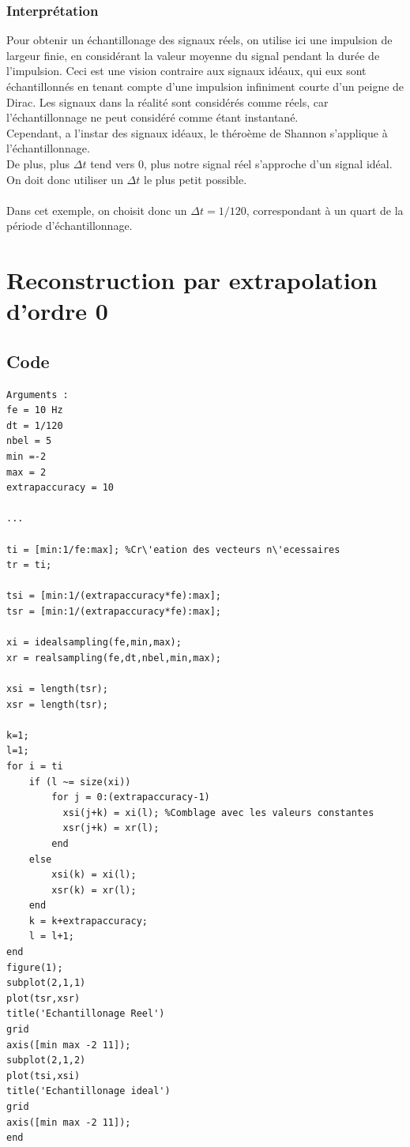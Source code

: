 \documentclass[a4paper, oneside]{report}
\begin{document}
	\subsubsection{Interpr\'etation}
	Pour obtenir un échantillonage des signaux r\'eels, on utilise ici une impulsion de largeur finie, en consid\'erant la valeur moyenne du signal pendant la durée de l'impulsion. Ceci est une vision contraire aux signaux id\'eaux, qui eux sont \'echantillonn\'es en tenant compte d'une impulsion infiniment courte d'un peigne de Dirac. Les signaux dans la r\'ealit\'e sont consid\'er\'es comme r\'eels, car l'\'echantillonnage ne peut  consid\'er\'e comme \'etant instantan\'e.
	\\
	Cependant, a l'instar des signaux id\'eaux, le th\'ero\`eme de Shannon s'applique \`a l'\'echantillonnage. \\
	De plus, plus $\Delta t$ tend vers 0, plus notre signal r\'eel s'approche d'un signal id\'eal. On doit donc utiliser un $\Delta t$ le plus petit possible.
	\\
	\\
	Dans cet exemple, on choisit donc un $\Delta t = 1/120$, correspondant \`a un quart de la p\'eriode d'\'echantillonnage.
	
	\newpage{}
	\section{Reconstruction par extrapolation d'ordre 0}
 	\subsection{Code}
	
	 \begin{lstlisting}
Arguments :
fe = 10 Hz
dt = 1/120
nbel = 5
min =-2
max = 2
extrapaccuracy = 10

...
	 
ti = [min:1/fe:max]; %Cr\'eation des vecteurs n\'ecessaires
tr = ti;

tsi = [min:1/(extrapaccuracy*fe):max];
tsr = [min:1/(extrapaccuracy*fe):max];

xi = idealsampling(fe,min,max);
xr = realsampling(fe,dt,nbel,min,max);

xsi = length(tsr);
xsr = length(tsr);

k=1;
l=1;
for i = ti
    if (l ~= size(xi))
        for j = 0:(extrapaccuracy-1)
          xsi(j+k) = xi(l); %Comblage avec les valeurs constantes
          xsr(j+k) = xr(l);
        end
    else
        xsi(k) = xi(l);
        xsr(k) = xr(l);
    end
    k = k+extrapaccuracy;
    l = l+1;
end
figure(1);
subplot(2,1,1)
plot(tsr,xsr)
title('Echantillonage Reel')
grid
axis([min max -2 11]);
subplot(2,1,2)
plot(tsi,xsi)
title('Echantillonage ideal')
grid
axis([min max -2 11]);
end
    \end{lstlisting}  
	
\end{document}
